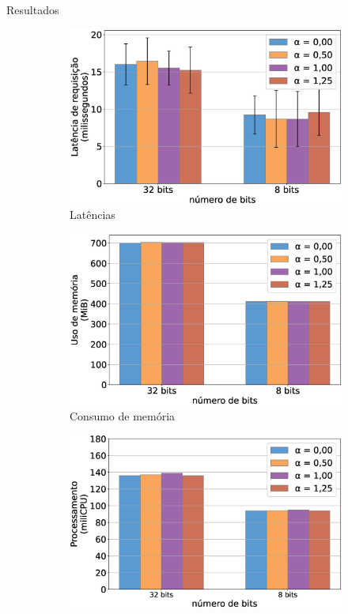 \begin{frame}{Resultados}
    \begin{figure}[H]
        \centering
        \begin{subfigure}[b]{0.32\textwidth}
            \includegraphics[width=\textwidth]{figuras/latencia2.eps}
            \caption{\scriptsize{Latências}}
          \end{subfigure}  
          \begin{subfigure}[b]{0.32\textwidth}
            \includegraphics[width=\textwidth]{figuras/memoria2.eps}
            \caption{\scriptsize{Consumo de memória}}
        \end{subfigure}
        \begin{subfigure}[b]{0.32\textwidth}
            \includegraphics[width=\textwidth]{figuras/cpu2.eps}

\end{subfigure}
\end{figure}
\end{frame}
